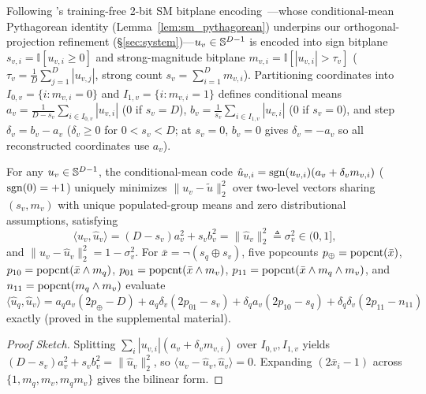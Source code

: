 Following {\quiver}'s training-free 2-bit {SM} bitplane encoding~\cite{xiao2026quiver}---whose conditional-mean Pythagorean identity (Lemma~\ref{lem:sm_pythagorean}) underpins our orthogonal-projection refinement (\S\ref{sec:system})---$u_v \in \mathbb{S}^{D-1}$ is encoded into sign bitplane $s_{v,i} = \mathbb{I}[u_{v,i} \ge 0]$ and strong-magnitude bitplane $m_{v,i} = \mathbb{I}[|u_{v,i}| > \tau_v]$ ($\tau_v = \frac{1}{D}\sum_{j=1}^D |u_{v,j}|$, strong count $s_v = \sum_{i=1}^D m_{v,i}$).
Partitioning coordinates into $I_{0,v} = \{i : m_{v,i} = 0\}$ and $I_{1,v} = \{i : m_{v,i} = 1\}$ defines conditional means $a_v = \frac{1}{D - s_v}\sum_{i \in I_{0,v}} |u_{v,i}|$ ($0$ if $s_v = D$), $b_v = \frac{1}{s_v}\sum_{i \in I_{1,v}} |u_{v,i}|$ ($0$ if $s_v = 0$), and step $\delta_v = b_v - a_v$ ($\delta_v \ge 0$ for $0 < s_v < D$; at $s_v = 0$, $b_v = 0$ gives $\delta_v = -a_v$ so all reconstructed coordinates use $a_v$).

\begin{lemma}
\label{lem:sm_pythagorean}
For any $u_v \in \mathbb{S}^{D-1}$, the conditional-mean code $\hat{u}_{v,i} = \operatorname{sgn}(u_{v,i})(a_v + \delta_v m_{v,i})$ ($\operatorname{sgn}(0) = +1$) uniquely minimizes $\|u_v - \tilde{u}\|_2^2$ over two-level vectors sharing $(s_v, m_v)$ with unique populated-group means and zero distributional assumptions, satisfying
\begin{equation}
  \langle u_v, \hat{u}_v\rangle = (D - s_v)a_v^2 + s_v b_v^2 = \|\hat{u}_v\|_2^2 \triangleq \sigma_v^2 \in (0, 1],
  \label{eq:sm_pythagorean}
\end{equation}
and $\|u_v - \hat{u}_v\|_2^2 = 1 - \sigma_v^2$.
For $\bar{x} = \neg(s_q \oplus s_v)$, five popcounts $p_{\oplus} = \operatorname{popcnt}(\bar{x})$, $p_{10} = \operatorname{popcnt}(\bar{x} \wedge m_q)$, $p_{01} = \operatorname{popcnt}(\bar{x} \wedge m_v)$, $p_{11} = \operatorname{popcnt}(\bar{x} \wedge m_q \wedge m_v)$, and $n_{11} = \operatorname{popcnt}(m_q \wedge m_v)$ evaluate $\langle \hat{u}_q, \hat{u}_v\rangle = a_q a_v(2 p_{\oplus} - D) + a_q\delta_v(2 p_{01} - s_v) + \delta_q a_v(2 p_{10} - s_q) + \delta_q\delta_v(2 p_{11} - n_{11})$ exactly (proved in the supplemental material).
\end{lemma}
\begin{proof}[Proof Sketch]
Splitting $\sum_i |u_{v,i}|(a_v + \delta_v m_{v,i})$ over $I_{0,v}, I_{1,v}$ yields $(D - s_v)a_v^2 + s_v b_v^2 = \|\hat{u}_v\|_2^2$, so $\langle u_v - \hat{u}_v, \hat{u}_v\rangle = 0$.
Expanding $(2\bar{x}_i - 1)$ across $\{1, m_q, m_v, m_q m_v\}$ gives the bilinear form.
\end{proof}

